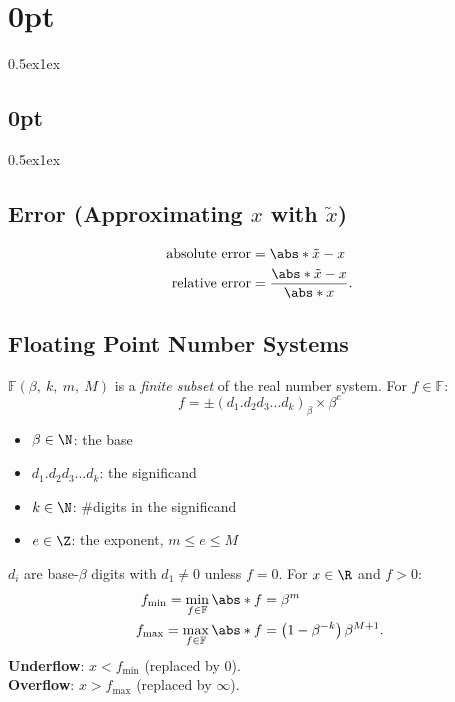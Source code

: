 \documentclass{article}
\begin{document}
\titlespacing*\section{0pt}{0.5ex}{1ex}
\titlespacing*\subsection{0pt}{0.5ex}{1ex}
%
\setlength\abovecaptionskip{8pt}
\setlength\belowcaptionskip{-15pt}
\setlength\textfloatsep{0pt}
%
\setlength\abovedisplayskip{1pt}
\setlength\belowdisplayskip{1pt}

\begin{multicols}{3}
    \subsection{Error (Approximating \texorpdfstring{\(x\)}{x} with \texorpdfstring{\(\tilde{x}\)}{tilde-x})}
    \begin{align*}
        \text{absolute error} & = \abs*{\tilde{x}-x}                   \\
        \text{relative error} & = \frac{\abs*{\tilde{x}-x}}{\abs*{x}}.
    \end{align*}
    \subsection{Floating Point Number Systems}
    \(\mathbb{F}\left( \beta,\: k,\: m,\: M \right)\)
    is a \textit{finite subset} of the real number system. For \(f \in \mathbb{F}\):
    \begin{equation*}
        f = \pm \left( d_1.d_2 d_3 \dots d_k \right)_\beta \times \beta^e
    \end{equation*}
    \begin{itemize}
        \item \(\beta \in \N\): the base
        \item \(d_1.d_2 d_3 \dots d_k\): the significand
        \item \(k \in \N\): \#digits in the significand
        \item \(e \in \Z\): the exponent, \(m \leq e \leq M\)
    \end{itemize}
    \(d_i\) are base-\(\beta\) digits with \(d_1 \neq 0\) unless \(f = 0\).
    For \(x \in \R\) and \(f > 0\):
    \begin{align*}
        f_{\min} = \min_{f \in \mathbb{F}} \abs*{f} & = \beta^m                                      \\
        f_{\max} = \max_{f \in \mathbb{F}} \abs*{f} & = \left( 1 - \beta^{-k} \right) \beta^{M + 1}.
    \end{align*}
    \textbf{Underflow}: \(x < f_{\min}\) (replaced by \(0\)). \\
    \textbf{Overflow}: \(x > f_{\max}\) (replaced by \(\infty\)).


\end{multicols}
\end{document}
